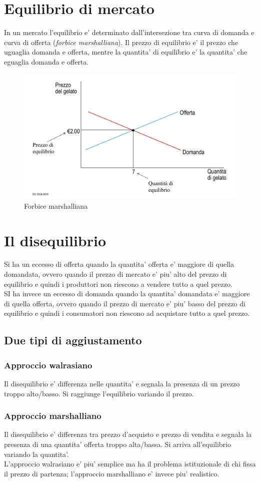 \documentclass{report}
\begin{document}
	\section{Equilibrio di mercato}
	In un mercato l'equilibrio e' determinato dall'intersezione tra curva di domanda e curva di offerta (\textit{forbice marshalliana}). Il prezzo di equilibrio e' il prezzo che uguaglia domanda e offerta, mentre la quantita' di equilibrio e' la quantita' che eguaglia domanda e offerta.
	\begin{figure}[h]
		\centering
		\includegraphics[width=0.7\linewidth]{forbice-marshalliana}
		\caption[Forbice marshalliana]{Forbice marshalliana}
		\label{fig:forbice-marshalliana}
	\end{figure}
	\section{Il disequilibrio}
	Si ha un eccesso di offerta quando la quantita' offerta e' maggiore di quella domandata, ovvero quando il prezzo di mercato e' piu' alto del prezzo di equilibrio e quindi i produttori non riescono a vendere tutto a quel prezzo.
	\medskip \\
	SI ha invece un eccesso di domanda quando la quantita' domandata e' maggiore di quella offerta, ovvero quando il prezzo di mercato e' piu' basso del prezzo di equilibrio e quindi i consumatori non riescono ad acquistare tutto a quel prezzo.
	\subsection{Due tipi di aggiustamento}
	\subsubsection{Approccio walrasiano}
	Il disequilibrio e' differenza nelle quantita' e segnala la presenza di un prezzo troppo alto/basso. Si raggiunge l'equilibrio variando il prezzo.
	\subsubsection{Approccio marshalliano}
	Il disequilibrio e' differenza tra prezzo d'acquisto e prezzo di vendita e segnala la presenza di una quantita' offerta troppo alta/bassa. Si arriva all'equilibrio variando la quantita'.
	\medskip \\L'approccio walrasiano e' piu' semplice ma ha il problema istituzionale di chi fissa il prezzo di partenza; l'approccio marshalliano e' invece piu' realistico.
\end{document}
